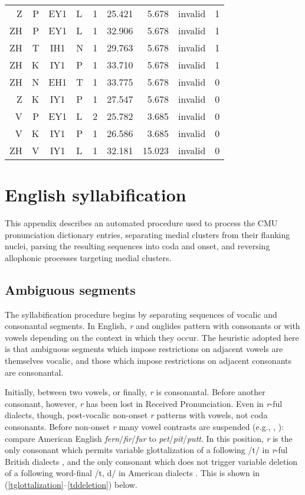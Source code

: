 \documentclass[12pt]{article}
\begin{document}
\begin{longtable}{r@{ }r@{ }c@{ }l@{ } rrrrr}
 Z & P & EY1 & L & 1 & 25.421 &  5.678 & invalid & 1 \\
ZH & P & EY1 & L & 1 & 32.906 &  5.678 & invalid & 1 \\
ZH & T & IH1 & N & 1 & 29.763 &  5.678 & invalid & 1 \\
ZH & K & IY1 & P & 1 & 33.710 &  5.678 & invalid & 1 \\
ZH & N & EH1 & T & 1 & 33.775 &  5.678 & invalid & 0 \\
 Z & K & IY1 & P & 1 & 27.547 &  5.678 & invalid & 0 \\
 V & P & EY1 & L & 2 & 25.782 &  3.685 & invalid & 0 \\
 V & K & IY1 & P & 1 & 26.586 &  3.685 & invalid & 0 \\
ZH & V & IY1 & L & 1 & 32.181 & 15.023 & invalid & 0 \\
\bottomrule
\end{longtable}

\section{English syllabification}
\label{syllabification}

This appendix describes an automated procedure used to process the CMU pronunciation dictionary entries, separating medial clusters from their flanking nuclei, parsing the resulting sequences into coda and onset, and reversing allophonic processes targeting medial clusters.

\subsection{Ambiguous segments}

The syllabification procedure begins by separating sequences of vocalic and consonantal segments. In English, \emph{r} and onglides pattern with consonants or with vowels depending on the context in which they occur. The heuristic adopted here is that ambiguous segments which impose restrictions on adjacent vowels are themselves vocalic, and those which impose restrictions on adjacent consonants are consonantal.

Initially, between two vowels, or finally, \emph{r} is consonantal. Before another consonant, however, \emph{r} has been lost in Received Pronunciation. Even in \emph{r}-ful dialects, though, post-vocalic non-onset \emph{r} patterns with vowels, not coda consonants. Before non-onset \emph{r} many vowel contrasts are suspended (e.g., \citealp[269f.]{Fudge1969}, \citealp[][255]{Harris1994}): compare American English \emph{fern}/\emph{fir}/\emph{fur} to \emph{pet}/\emph{pit}/\emph{putt}. In this position, \emph{r} is the only consonant which permits variable glottalization of a following /t/ in \emph{r}-ful British dialects \citep[258]{Harris1994}, and the only consonant which does not trigger variable deletion of a following word-final /t, d/ in American dialects \citep[8]{Guy1980}. This is shown in (\ref{tglottalization}--\ref{tddeletion}) below.
\end{document}
